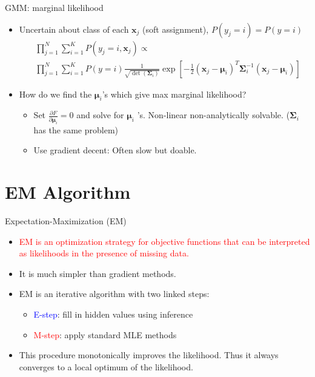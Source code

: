 \documentclass[12pt]{beamer}
\begin{document}
\begin{frame}{GMM: marginal likelihood}
\begin{itemize}
	\item Uncertain about class of each $\bm{x}_j$ (soft assignment), $P(y_j=i)=P(y=i)$
	\begin{equation} \nonumber
	\begin{aligned}
	&\prod_{j=1}^{N}\sum_{i=1}^{K}P(y_j=i,\bm{x}_j)\propto \\
	&\prod_{j=1}^{N}\sum_{i=1}^{K}P(y=i)\frac{1}{\sqrt{\det(\mathbf{\Sigma}_i)}}\exp \left[-\frac{1}{2}(\bm{x}_j-\bm{\mu}_i)^T\mathbf{\Sigma}_i^{-1}(\bm{x}_j-\bm{\mu}_i)\right]
	\end{aligned}
	\end{equation}
	\item How do we find the $\bm{\mu}_i$'s which give max marginal likelihood? \\[6pt]
	\begin{itemize}
		\item Set $\frac{\partial F}{\partial \bm{\mu}_i}=0$ and solve for $\bm{\mu}_i$ 's. Non-linear non-analytically solvable. \small{($\mathbf{\Sigma}_i$ has the same problem)}
		\item Use gradient decent: Often slow but doable.
	\end{itemize}
\end{itemize}
\end{frame}

\section{EM Algorithm}
\begin{frame}{Expectation-Maximization (EM)}
\begin{itemize}
	\item \textcolor{red}{EM is an optimization strategy for objective functions that can be interpreted as likelihoods in the presence of missing data.}
	\item It is much simpler than gradient methods.
	\item EM is an iterative algorithm with two linked steps:
	\begin{itemize}
		\item \textcolor{blue}{E-step}: fill in hidden values using inference
		\item \textcolor{red}{M-step}: apply standard MLE methods
	\end{itemize}
	\item This procedure monotonically improves the likelihood. Thus it always converges to a local optimum of the likelihood.
\end{itemize}
\end{frame}
\end{document}
